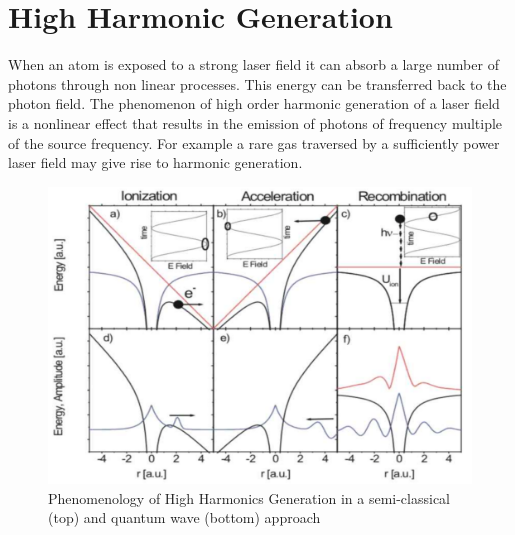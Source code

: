 \section{High Harmonic Generation}
When an atom is exposed to a strong laser field it can absorb a large number of photons through non linear processes. This energy can be transferred back to the photon field.
The phenomenon of high order harmonic generation of a laser field is a nonlinear effect that results in the emission of photons of frequency multiple of the source frequency. For example a rare gas traversed by a sufficiently power laser field may give rise to harmonic generation.
\begin{figure}[htbp]
\begin{center}
\includegraphics[width=12cm]{../Pictures/Chapter_7/HHG}
\end{center}
\caption[HHG phenomenology]{Phenomenology of High Harmonics Generation in a semi-classical (top) and quantum wave (bottom) approach}
\label{fig:HHG}
\end{figure}

